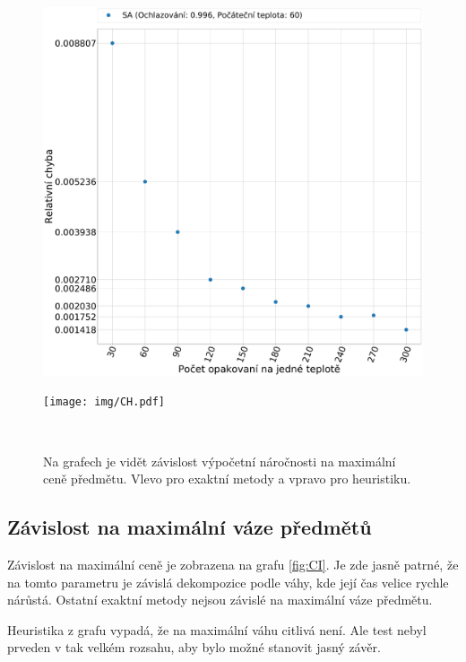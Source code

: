 \documentclass[11pt]{article}
\begin{document}
\begin{figure}
	\centering
    \begin{minipage}[c]{0.49\textwidth}
        \centering\includegraphics[width=\textwidth]{img/CE.pdf} 
    \end{minipage}
    \begin{minipage}[c]{0.49\textwidth}
        \centering \texttt{[image: img/CH.pdf]} 
    \end{minipage}
    \\
   \caption{Na grafech je vidět závislost výpočetní náročnosti na maximální ceně předmětu. Vlevo pro exaktní metody a vpravo pro heuristiku.}\label{fig:WI}
    \end{figure} 


\subsection{Závislost na maximální váze předmětů}

Závislost na maximální ceně je zobrazena na grafu \ref{fig:CI}. Je zde jasně patrné, že na tomto parametru je závislá dekompozice podle váhy, kde její čas velice rychle nárůstá. Ostatní exaktní metody nejsou závislé na maximální váze předmětu. 

Heuristika z grafu vypadá, že na maximální váhu citlivá není. Ale test nebyl prveden v tak velkém rozsahu, aby bylo možné stanovit jasný závěr.
\end{document}
